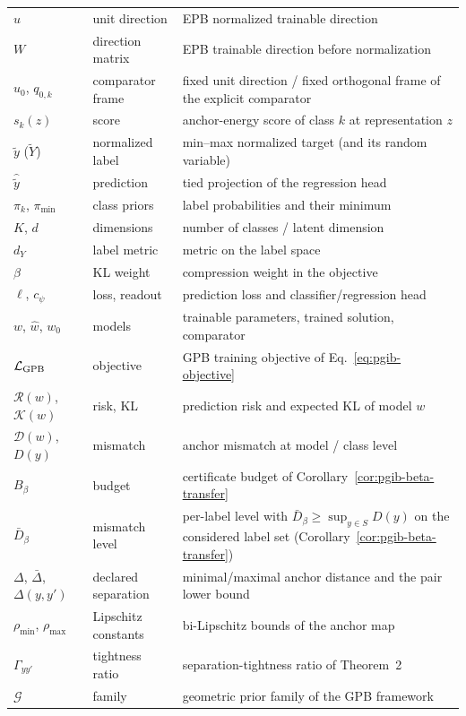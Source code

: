 \begin{center}
\begin{longtable}{l l p{7.5cm}}
$u$ & unit direction & EPB normalized trainable direction \\
$W$ & direction matrix & EPB trainable direction before normalization \\
$u_0$, $q_{0,k}$ & comparator frame & fixed unit direction / fixed orthogonal frame of the explicit comparator \\
$s_k(z)$ & score & anchor-energy score of class $k$ at representation $z$ \\
$\tilde y$ ($\tilde Y$) & normalized label & min--max normalized target (and its random variable) \\
$\hat{\tilde y}$ & prediction & tied projection of the regression head \\
$\pi_k$, $\pi_{\min}$ & class priors & label probabilities and their minimum \\
$K$, $d$ & dimensions & number of classes / latent dimension \\
$d_Y$ & label metric & metric on the label space \\
$\beta$ & KL weight & compression weight in the objective \\
$\ell$, $c_\psi$ & loss, readout & prediction loss and classifier/regression head \\
$w$, $\widehat w$, $w_0$ & models & trainable parameters, trained solution, comparator \\
$\mathcal L_{\rm GPB}$ & objective & GPB training objective of Eq.~\eqref{eq:pgib-objective} \\
$\mathcal R(w)$, $\mathcal K(w)$ & risk, KL & prediction risk and expected KL of model $w$ \\
$\mathcal D(w)$, $D(y)$ & mismatch & anchor mismatch at model / class level \\
$B_\beta$ & budget & certificate budget of Corollary~\ref{cor:pgib-beta-transfer} \\
$\bar D_\beta$ & mismatch level & per-label level with $\bar D_\beta\ge\sup_{y\in S}D(y)$ on the considered label set (Corollary~\ref{cor:pgib-beta-transfer}) \\
$\Delta$, $\bar\Delta$, $\Delta(y,y')$ & declared separation & minimal/maximal anchor distance and the pair lower bound \\
$\rho_{\min}$, $\rho_{\max}$ & Lipschitz constants & bi-Lipschitz bounds of the anchor map \\
$\Gamma_{yy'}$ & tightness ratio & separation-tightness ratio of Theorem~2 \\
$\mathcal G$ & family & geometric prior family of the GPB framework \\

\end{longtable}
\end{center}

